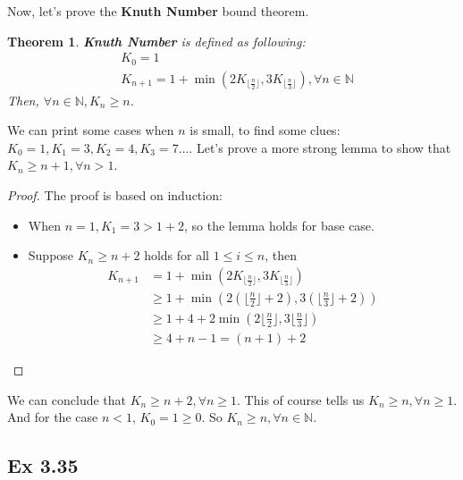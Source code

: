 \documentclass{article}
\newtheorem{theorem}{Theorem}[section]
\begin{document}
Now, let's prove the \textbf{Knuth Number} bound theorem.

\begin{theorem}
\textbf{Knuth Number} is defined as following:
\begin{equation}
    \begin{split}
        & K_0 = 1\\
        & K_{n+1} = 1 + \min(2K_{\lfloor \frac{n}{2} \rfloor}, 3K_{\lfloor \frac{n}{3} \rfloor}), \forall n \in \mathbb{N}
    \end{split}
\end{equation}
Then, $\forall n \in \mathbb{N}, K_n \ge n$.
\end{theorem}

We can print some cases when $n$ is small, to find some clues: $K_0=1, K_1=3, K_2=4, K_3 = 7 \dots$. Let's prove a more strong lemma to show that $K_n \ge n + 1, \forall n > 1$.

\begin{proof}
The proof is based on induction:
\begin{itemize}
    \item When $n=1, K_1 = 3 > 1 + 2$, so the lemma holds for base case.
    \item Suppose $K_n \ge n + 2$ holds for all $1 \le i \le n$, then
          \begin{equation}
          \begin{split}
              K_{n+1} & = 1 + \min(2K_{\lfloor \frac{n}{2} \rfloor}, 3K_{\lfloor \frac{n}{3} \rfloor})\\
                      & \ge 1 + \min(2(\lfloor \frac{n}{2} \rfloor + 2), 3(\lfloor \frac{n}{3} \rfloor +2))\\
                      & \ge 1 + 4 + 2 \min(2\lfloor \frac{n}{2} \rfloor , 3 \lfloor \frac{n}{3} \rfloor)\\
                      & \ge 4 + n - 1 = (n + 1) + 2
          \end{split}
          \end{equation}
\end{itemize}
\end{proof}
We can conclude that $K_n \ge n + 2, \forall n \ge 1$. This of course tells us $K_n \ge n, \forall n \ge 1$. And for the case $n < 1$, $K_0=1\ge0$. So $K_n \ge n, \forall n \in \mathbb{N}$.

\subsection{Ex 3.35}
\end{document}

